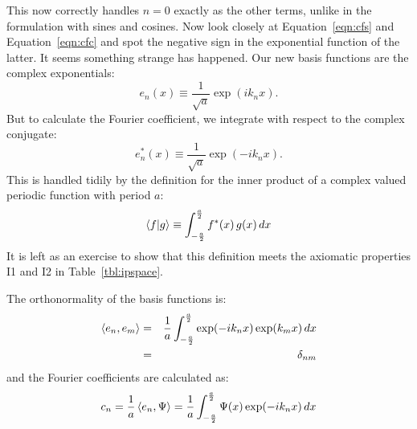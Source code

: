 \documentclass[12pt]{book}
\begin{document}
This now correctly handles $n=0$ exactly as the other terms, unlike in the formulation with sines and cosines.  Now look closely at Equation~\ref{eqn:cfs} and Equation~\ref{eqn:cfc} and spot the negative sign in the exponential function of the latter.  It seems something strange has happened.  Our new basis functions are the complex exponentials:
\begin{equation}
e_n(x) \equiv \frac{1}{\sqrt{a}}\exp(i k_n x).  
\end{equation}
But to calculate the Fourier coefficient, we integrate with respect to the complex conjugate:
\begin{equation}
e_n^*(x) \equiv \frac{1}{\sqrt{a}}\exp(-i k_n x).  
\end{equation}
This is handled tidily by the definition for the inner product of a complex valued periodic function with period $a$:
\begin{equation}
\braket{f|g} \equiv \int_{-\frac{a}{2}}^{\frac{a}{2}} f^*(x) \, g(x) \, dx
\end{equation}
It is left as an exercise to show that this definition meets the axiomatic properties I1 and I2 in Table~\ref{tbl:ipspace}.

The orthonormality of the basis functions is:
\begin{eqnarray}
\braket{e_n, e_m} &=& \frac{1}{a} \int_{-\frac{a}{2}}^{\frac{a}{2}}  \exp(-i k_n x) \exp(k_m x) \, dx \nonumber \\
&=& \delta_{nm} \label{eqn:eno}
\end{eqnarray}
and the Fourier coefficients are calculated as:
\begin{equation}
c_n = \frac{1}{a} \braket{e_n, \Psi} = \frac{1}{a} \int_{-\frac{a}{2}}^{\frac{a}{2}} \Psi(x) \exp(-i k_n x) \, dx
\end{equation}
\end{document}
